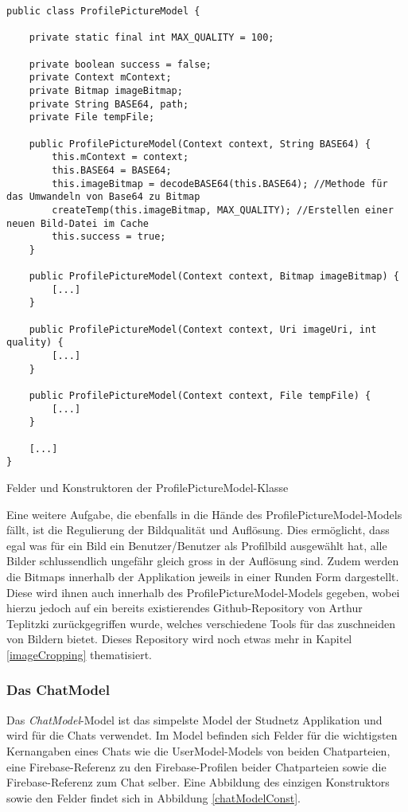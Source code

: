 \documentclass[../main.tex]{subfiles}
\begin{document}
\begin{code}
	\begin{center}
		\begin{verbatim}
public class ProfilePictureModel {

	private static final int MAX_QUALITY = 100;

	private boolean success = false;
	private Context mContext;
	private Bitmap imageBitmap;
	private String BASE64, path;
	private File tempFile;

	public ProfilePictureModel(Context context, String BASE64) {
		this.mContext = context;
		this.BASE64 = BASE64;
		this.imageBitmap = decodeBASE64(this.BASE64); //Methode für das Umwandeln von Base64 zu Bitmap
		createTemp(this.imageBitmap, MAX_QUALITY); //Erstellen einer neuen Bild-Datei im Cache
		this.success = true;
	}

	public ProfilePictureModel(Context context, Bitmap imageBitmap) {
		[...]
	}

	public ProfilePictureModel(Context context, Uri imageUri, int quality) {
		[...]
	}

	public ProfilePictureModel(Context context, File tempFile) {
		[...]
	}
	
	[...]
}
		\end{verbatim}
		\caption{Felder und Konstruktoren der ProfilePictureModel-Klasse}
		\label{profilePictureModelConst}
	\end{center}
	
\end{code}

	Eine weitere Aufgabe, die ebenfalls in die Hände des ProfilePictureModel-Models fällt, ist die Regulierung der Bildqualität und Auflösung. Dies ermöglicht, dass egal was für ein Bild ein Benutzer/Benutzer als Profilbild ausgewählt hat, alle Bilder schlussendlich ungefähr gleich gross in der Auflösung sind. Zudem werden die Bitmaps innerhalb der Applikation jeweils in einer Runden Form dargestellt. Diese wird ihnen auch innerhalb des ProfilePictureModel-Models gegeben, wobei hierzu jedoch auf ein bereits existierendes Github-Repository von Arthur Teplitzki zurückgegriffen wurde, welches verschiedene Tools für das zuschneiden von Bildern bietet. Dieses Repository wird noch etwas mehr in Kapitel \ref{imageCropping} thematisiert.
	
	\subsubsection{Das ChatModel}
	Das \emph{ChatModel}-Model ist das simpelste Model der Studnetz Applikation und wird für die Chats verwendet. Im Model befinden sich Felder für die wichtigsten Kernangaben eines Chats wie die UserModel-Models von beiden Chatparteien, eine Firebase-Referenz zu den Firebase-Profilen beider Chatparteien sowie die Firebase-Referenz zum Chat selber. Eine Abbildung des einzigen Konstruktors sowie den Felder findet sich in Abbildung \ref{chatModelConst}.
	
\end{document}
